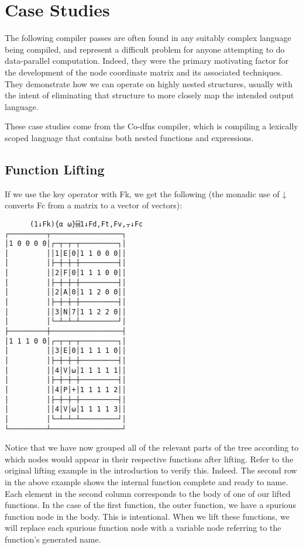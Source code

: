\documentclass[numbers,preprint]{sigplanconf}
\begin{document}
\section{Case Studies}

The following compiler passes are often found in any suitably complex 
language being compiled, and represent a difficult problem for anyone attempting 
to do data-parallel computation. Indeed, they were the primary motivating 
factor for the development of the node coordinate matrix and its associated 
techniques. They demonstrate how we can operate on highly nested structures, 
usually with the intent of eliminating that structure to more closely map 
the intended output language. 

These case studies come from the Co-dfns compiler, which is compiling a 
lexically scoped language that contains both nested functions and 
expressions. 

\subsection{Function Lifting}

If we use the key operator with Fk, we get the following (the monadic
use of ↓ converts Fc from a matrix to a vector of vectors):

\begin{verbatim}
      (1↓Fk){⍺ ⍵}⌸1↓Fd,Ft,Fv,⍪↓Fc
┌─────────┬─────────────────┐
│1 0 0 0 0│┌─┬─┬─┬─────────┐│
│         ││1│E│0│1 1 0 0 0││
│         │├─┼─┼─┼─────────┤│
│         ││2│F│0│1 1 1 0 0││
│         │├─┼─┼─┼─────────┤│
│         ││2│A│0│1 1 2 0 0││
│         │├─┼─┼─┼─────────┤│
│         ││3│N│7│1 1 2 2 0││
│         │└─┴─┴─┴─────────┘│
├─────────┼─────────────────┤
│1 1 1 0 0│┌─┬─┬─┬─────────┐│
│         ││3│E│0│1 1 1 1 0││
│         │├─┼─┼─┼─────────┤│
│         ││4│V│⍵│1 1 1 1 1││
│         │├─┼─┼─┼─────────┤│
│         ││4│P│+│1 1 1 1 2││
│         │├─┼─┼─┼─────────┤│
│         ││4│V│⍵│1 1 1 1 3││
│         │└─┴─┴─┴─────────┘│
└─────────┴─────────────────┘
\end{verbatim}

Notice that we have now grouped all of the relevant parts of the
tree according to which nodes would appear in their respective
functions after lifting. Refer to the original lifting example in
the introduction to verify this. Indeed. The second row in the
above example shows the internal function complete and ready to
name. Each element in the second column corresponds to the body of
one of our lifted functions. In the case of the first function, the
outer function, we have a spurious function node in the body. This
is intentional. When we lift these functions, we will replace
each spurious function node with a variable node referring to the
function’s generated name.
\end{document}
